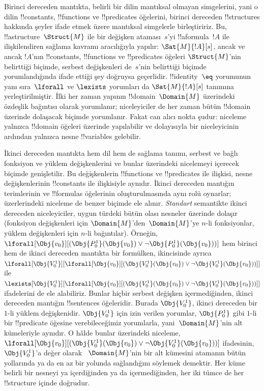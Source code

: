 



Birinci dereceden mantıkta, belirli bir dilin mantıksal olmayan simgelerini,
yani o dilin !!{constant}s, !!{function}s ve !!{predicate}s öğelerini,
birinci dereceden !!{structure}s hakkında şeyler ifade etmek üzere mantıksal
simgelerle birleştiririz. Bu, !!a{structure}~$\Struct{M}$ ile bir değişken
ataması~$s$'yi !!a{formula}~$!A$ ile ilişkilendiren sağlama kavramı
aracılığıyla yapılır: $\Sat{M}{!A}[s]$, ancak ve ancak $!A$'nın
!!{constant}s, !!{function}s ve !!{predicate}s öğeleri $\Struct{M}$'nin
belirttiği biçimde, serbest değişkenleri de~$s$'nin belirttiği biçimde
yorumlandığında ifade ettiği şey doğruysa geçerlidir. !!{identity}~$\eq$
yorumunun yanı sıra~$\lforall$ ve $\lexists$ yorumları da
$\Sat{M}{!A}[s]$ tanımına yerleştirilmiştir. İlki her zaman yapının
!!{domain}~$\Domain{M}$ üzerindeki özdeşlik bağıntısı olarak yorumlanır;
niceleyiciler de her zaman bütün !!{domain} üzerinde dolaşacak biçimde
yorumlanır. Fakat can alıcı nokta şudur: niceleme yalnızca !!{domain}
öğeleri üzerinde yapılabilir ve dolayısıyla bir niceleyicinin ardından
yalnızca nesne !!{variable}s gelebilir.

İkinci dereceden mantıkta hem dil hem de sağlama tanımı, serbest ve bağlı
fonksiyon ve yüklem değişkenlerini ve bunlar üzerindeki nicelemeyi içerecek
biçimde genişletilir. Bu değişkenlerin !!{function}s ve !!{predicate}s ile
ilişkisi, nesne değişkenlerinin !!{constant}s ile ilişkisiyle aynıdır.
İkinci dereceden mantığın terimlerinin ve !!{formula}s öğelerinin
oluşturulmasında aynı rolü oynarlar; üzerlerindeki niceleme de benzer biçimde
ele alınır. \emph{Standart} semantikte ikinci dereceden niceleyiciler, uygun
türdeki bütün olası nesneler üzerinde dolaşır (fonksiyon değişkenleri için
$\Domain{M}$'den~$\Domain{M}$'ye $n$-li fonksiyonlar, yüklem değişkenleri
için $n$-li bağıntılar). Örneğin,
$\lforall[\Obj{v_0}][(\Obj{P^1_0}(\Obj{v_0}) \lor \lnot
  \Obj{P^1_0}(\Obj{v_0}))]$ hem birinci hem de ikinci dereceden mantıkta bir
formülken, ikincisinde ayrıca
$\lforall[\Obj{V^1_0}][\lforall[\Obj{v_0}][(\Obj{V^1_0}(\Obj{v_0}) \lor
    \lnot \Obj{V^1_0}(\Obj{v_0}))]]$ ile
$\lexists[\Obj{V^1_0}][\lforall[\Obj{v_0}][(\Obj{V^1_0}(\Obj{v_0}) \lor
    \lnot \Obj{V^1_0}(\Obj{v_0}))]]$ ifadelerini de ele alabiliriz. Bunlar
hiçbir serbest değişken içermediğinden, ikinci dereceden mantığın
!!{sentence}s öğeleridir. Burada $\Obj{V^1_0}$, ikinci dereceden bir $1$-li
yüklem değişkenidir. $\Obj{V^1_0}$ için izin verilen yorumlar,
$\Obj{P^1_0}$ gibi $1$-li bir !!{predicate} öğesine verebileceğimiz yorumlarla,
yani~$\Domain{M}$'nin alt kümeleriyle aynıdır. O hâlde bunlar üzerindeki
niceleme,
$\lforall[\Obj{v_0}][(\Obj{V^1_0}(\Obj{v_0}) \lor \lnot
  \Obj{V^1_0}(\Obj{v_0}))]$ ifadesinin, $\Obj{V^1_0}$'a değer olarak
~$\Domain{M}$'nin bir alt kümesini atamanın bütün yollarında ya da en az bir
yolunda sağlandığını söylemek demektir. Her küme belirli bir nesneyi ya
içerdiğinden ya da içermediğinden, her iki tümce de her !!{structure}
içinde doğrudur.
